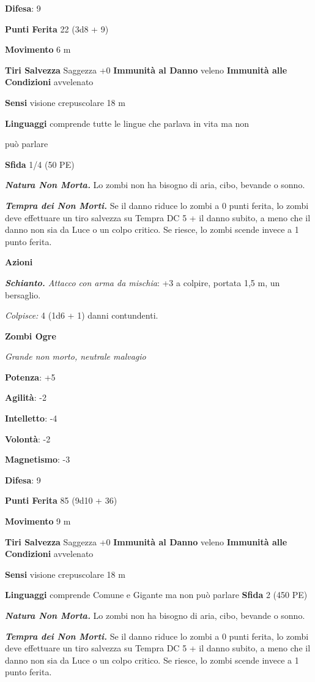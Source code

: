 \begin{multicols}{2}
\textbf{Difesa}: 9

\textbf{Punti Ferita} 22 (3d8 + 9)

\textbf{Movimento} 6 m

\textbf{Tiri Salvezza} Saggezza +0 \textbf{Immunità al Danno} veleno
\textbf{Immunità alle Condizioni} avvelenato

\textbf{Sensi} visione crepuscolare 18 m

\textbf{Linguaggi} comprende tutte le lingue che parlava in vita ma non

può parlare

\textbf{Sfida} 1/4 (50 PE)

\emph{\textbf{Natura Non Morta.}} Lo zombi non ha bisogno di aria, cibo,
bevande o sonno.

\emph{\textbf{Tempra dei Non Morti.}} Se il danno riduce lo zombi a 0
punti ferita, lo zombi deve effettuare un tiro salvezza su Tempra
DC 5 + il danno subito, a meno che il danno non sia da Luce o un colpo
critico. Se riesce, lo zombi scende invece a 1 punto ferita.

\textbf{Azioni}

\emph{\textbf{Schianto.} Attacco con arma da mischia}: +3 a colpire,
portata 1,5 m, un bersaglio.

\emph{Colpisce:} 4 (1d6 + 1) danni contundenti.

\textbf{Zombi Ogre}

\emph{Grande non morto, neutrale malvagio}

\textbf{Potenza}: +5

\textbf{Agilità}: -2

\textbf{Intelletto}: -4

\textbf{Volontà}: -2

\textbf{Magnetismo}: -3

\textbf{Difesa}: 9

\textbf{Punti Ferita} 85 (9d10 + 36)

\textbf{Movimento} 9 m

\textbf{Tiri Salvezza} Saggezza +0 \textbf{Immunità al Danno} veleno
\textbf{Immunità alle Condizioni} avvelenato

\textbf{Sensi} visione crepuscolare 18 m

\textbf{Linguaggi} comprende Comune e Gigante ma non può parlare
\textbf{Sfida} 2 (450 PE)

\emph{\textbf{Natura Non Morta.}} Lo zombi non ha bisogno di aria, cibo,
bevande o sonno.

\emph{\textbf{Tempra dei Non Morti.}} Se il danno riduce lo zombi a 0
punti ferita, lo zombi deve effettuare un tiro salvezza su Tempra
DC 5 + il danno subito, a meno che il danno non sia da Luce o un colpo
critico. Se riesce, lo zombi scende invece a 1 punto ferita.


\end{multicols}
